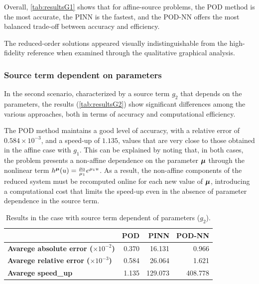 \documentclass[
    conference,
    nofonttune,
    11pt
]{IEEEtran}
\begin{document}
                Overall, \autoref{tab:resultsG1} shows that for affine-source problems, the POD method is the most accurate, the PINN is the fastest, and the POD-NN offers the most balanced trade-off between accuracy and efficiency.

                The reduced-order solutions appeared visually indistinguishable from the high-fidelity reference when examined through the qualitative graphical analysis.
                
                
            \subsubsection{Source term dependent on parameters}\label{secDependentCase}
                    
            In the second scenario, characterized by a source term $g_2$ that depends on the parameters, the results (\autoref{tab:resultsG2}) show significant differences among the various approaches, both in terms of accuracy and computational efficiency.

            The POD method maintains a good level of accuracy, with a relative error of $0.584 \times 10^{-3}$, and a speed-up of $1.135$, values that are very close to those obtained in the affine case with $g_1$. This can be explained by noting that, in both cases, the problem presents a non-affine dependence on the parameter ${\boldsymbol\mu}$ through the nonlinear term $h^{\boldsymbol\mu}(u) = \frac{\mu_0}{\mu_1} e^{\mu_1 u}$. As a result, the non-affine components of the reduced system must be recomputed online for each new value of ${\boldsymbol\mu}$, introducing a computational cost that limits the speed-up even in the absence of parameter dependence in the source term.

            \begin{table}[t]
                    \centering
                    \begin{tabular}{lrrr}
                        \textbf{} & \textbf{POD} & \textbf{PINN} & \textbf{POD-NN} \\ \hline
                        \textbf{Avarege absolute error ($\times10^{-2}$)} & 0.370 & 16.131 & 0.966 \\ 
                        \textbf{Avarege relative error ($\times10^{-3}$)} & 0.584 & 26.064 & 1.621 \\ 
                        \textbf{Avarege speed\_up} & 1.135 & 129.073 & 408.778 \\ 
                    \end{tabular}
                    \caption{\label{tab:resultsG2} Results in the case with source term dependent of parameters ($g_2$).}
            \end{table}
            
\end{document}
